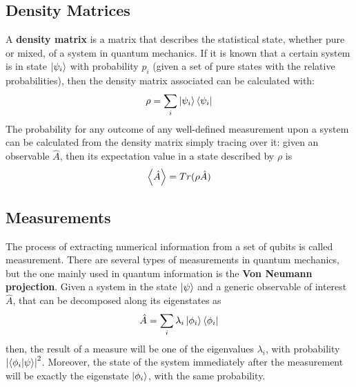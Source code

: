 \subsection{Density Matrices}
A \textbf{density matrix} is a matrix that describes the statistical state, whether pure or mixed, of a system in quantum mechanics. If it is known that a certain system is in state $\ket{\psi_i}$ with probability $p_i$ (given a set of pure states with the relative probabilities), then the density matrix associated can be calculated with:
\[ \rho = \sum_i\ket{\psi_i}\bra{\psi_i} \]
The probability for any outcome of any well-defined measurement upon a system can be calculated from the density matrix simply tracing over it: given an observable $\hat{A}$, then its expectation value in a state described by $\rho$ is
\[ \expval{\hat{A}} = Tr(\rho\hat{A}) \]

\subsection{Measurements}
The process of extracting numerical information from a set of qubits is called measurement. There are several types of measurements in quantum mechanics, but the one mainly used in quantum information is the \textbf{Von Neumann projection}. Given a system in the state $\ket{\psi}$ and a generic observable of interest $\hat{A}$, that can be decomposed along its eigenstates as 
\[ \hat{A} = \sum_i\lambda_i\ket{\phi_i}\bra{\phi_i} \]
then, the result of a measure will be one of the eigenvalues $\lambda_i$, with probability $\abs{\bra{\phi_i}\ket{\psi}}^2$. Moreover, the state of the system immediately after the measurement will be exactly the eigenstate $\ket{\phi_i}$, with the same probability.
